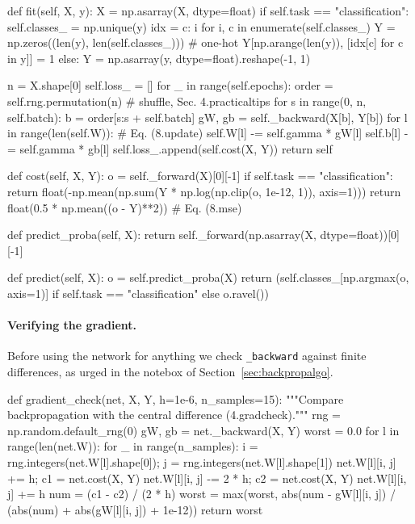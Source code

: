 \begin{Python}{}
    def fit(self, X, y):
        X = np.asarray(X, dtype=float)
        if self.task == "classification":
            self.classes_ = np.unique(y)
            idx = {c: i for i, c in enumerate(self.classes_)}
            Y = np.zeros((len(y), len(self.classes_)))        # one-hot
            Y[np.arange(len(y)), [idx[c] for c in y]] = 1
        else:
            Y = np.asarray(y, dtype=float).reshape(-1, 1)

        n = X.shape[0]
        self.loss_ = []
        for _ in range(self.epochs):
            order = self.rng.permutation(n)                   # shuffle, Sec. 4.practicaltips
            for s in range(0, n, self.batch):
                b = order[s:s + self.batch]
                gW, gb = self._backward(X[b], Y[b])
                for l in range(len(self.W)):                  # Eq. (8.update)
                    self.W[l] -= self.gamma * gW[l]
                    self.b[l] -= self.gamma * gb[l]
            self.loss_.append(self.cost(X, Y))
        return self

    def cost(self, X, Y):
        o = self._forward(X)[0][-1]
        if self.task == "classification":
            return float(-np.mean(np.sum(Y * np.log(np.clip(o, 1e-12, 1)), axis=1)))
        return float(0.5 * np.mean((o - Y)**2))               # Eq. (8.mse)

    def predict_proba(self, X):
        return self._forward(np.asarray(X, dtype=float))[0][-1]

    def predict(self, X):
        o = self.predict_proba(X)
        return (self.classes_[np.argmax(o, axis=1)]
                if self.task == "classification" else o.ravel())
\end{Python}

\paragraph{Verifying the gradient.}
Before using the network for anything we check \texttt{\_backward} against
finite differences, as urged in the notebox of
Section~\ref{sec:backpropalgo}.

\begin{Python}{}
def gradient_check(net, X, Y, h=1e-6, n_samples=15):
    """Compare backpropagation with the central difference (4.gradcheck)."""
    rng = np.random.default_rng(0)
    gW, gb = net._backward(X, Y)
    worst = 0.0
    for l in range(len(net.W)):
        for _ in range(n_samples):
            i = rng.integers(net.W[l].shape[0]); j = rng.integers(net.W[l].shape[1])
            net.W[l][i, j] += h; c1 = net.cost(X, Y)
            net.W[l][i, j] -= 2 * h; c2 = net.cost(X, Y)
            net.W[l][i, j] += h
            num = (c1 - c2) / (2 * h)
            worst = max(worst, abs(num - gW[l][i, j])
                        / (abs(num) + abs(gW[l][i, j]) + 1e-12))
    return worst
\end{Python}

